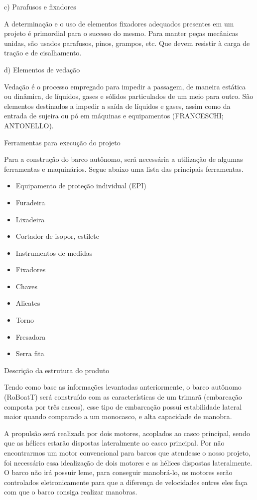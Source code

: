 c) Parafusos e fixadores

A determinação e o uso de elementos fixadores adequados presentes em um projeto é primordial para o sucesso do mesmo. Para manter peças mecânicas unidas, são usados parafusos, pinos, grampos, etc. Que devem resistir à carga de tração e de cisalhamento.

d) Elementos de vedação

Vedação é o processo empregado para impedir a passagem, de maneira estática ou dinâmica, de líquidos, gases e sólidos particulados de um meio para outro. São elementos destinados a impedir a saída de líquidos e gases, assim como da entrada de sujeira ou pó em máquinas e equipamentos (FRANCESCHI; ANTONELLO).

Ferramentas para execução do projeto


Para a construção do barco autônomo, será necessária a utilização de algumas ferramentas e maquinários. Segue abaixo uma lista das principais ferramentas.

\begin{itemize}
  \item      Equipamento de proteção individual (EPI)
\item         Furadeira            
\item        Lixadeira
\item      Cortador de isopor, estilete
\item        Instrumentos de medidas
\item       Fixadores
\item        Chaves
\item        Alicates
\item        Torno
\item       Fresadora
\item        Serra fita
\end{itemize}


Descrição da estrutura do produto

Tendo como base as informações levantadas anteriormente, o barco autônomo (RoBoatT) será construído com as características de um trimarã (embarcação composta por três cascos), esse tipo de embarcação possui estabilidade lateral maior quando comparado a um monocasco, e alta capacidade de manobra.

A propulsão será realizada por dois motores, acoplados ao casco principal, sendo que as hélices estarão dispostas lateralmente ao casco principal. Por não encontrarmos um motor convencional para barcos que atendesse o nosso projeto, foi necessário essa idealização de dois motores e as hélices dispostas lateralmente. O barco não irá possuir leme, para conseguir manobrá-lo, os motores serão controlados eletronicamente para que a diferença de velocidades entres eles faça com que o barco consiga realizar manobras. 

